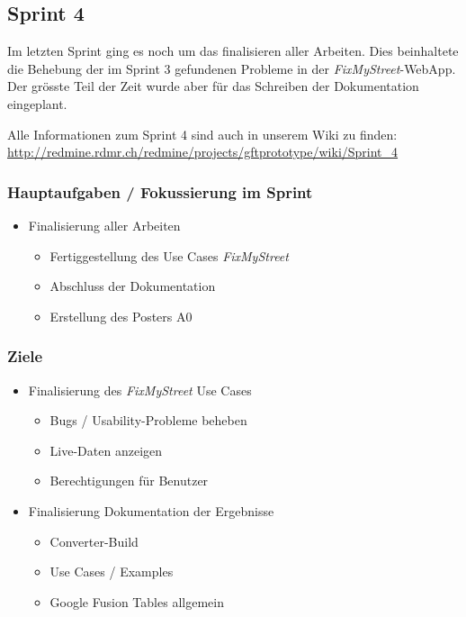 \subsection{Sprint 4}

Im letzten Sprint ging es noch um das finalisieren aller Arbeiten. Dies beinhaltete die Behebung der im Sprint 3 gefundenen Probleme in der \emph{FixMyStreet}-WebApp. Der grösste Teil der Zeit wurde aber für das Schreiben der Dokumentation eingeplant. 

Alle Informationen zum Sprint 4 sind auch in unserem Wiki zu finden:
\url{http://redmine.rdmr.ch/redmine/projects/gftprototype/wiki/Sprint_4}

\subsubsection{Hauptaufgaben / Fokussierung im Sprint}
\begin{itemize}
	\item Finalisierung aller Arbeiten
	\begin{itemize}
		\item Fertiggestellung des Use Cases \emph{FixMyStreet}
		\item Abschluss der Dokumentation
		\item Erstellung des Posters A0
	\end{itemize}
\end{itemize}

\subsubsection{Ziele}
\begin{itemize}
	\item Finalisierung des \emph{FixMyStreet} Use Cases
	\begin{itemize}
		\item Bugs / Usability-Probleme beheben
		\item Live-Daten anzeigen
		\item Berechtigungen für Benutzer
	\end{itemize}
	
	\item Finalisierung Dokumentation der Ergebnisse
	\begin{itemize}
		\item Converter-Build
		\item Use Cases / Examples
		\item Google Fusion Tables allgemein
	\end{itemize}
\end{itemize}

